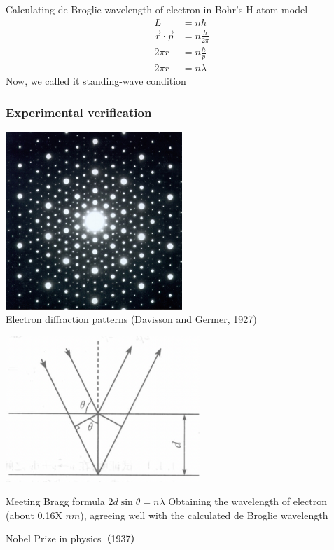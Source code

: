 \begin{frame}  
    \frame{}
    Calculating de Broglie wavelength of electron in Bohr's H atom model
    \begin{equation*}
        \begin{split}
            L&=n\hbar \\
            \vec{r} \cdot \vec{p} & =  n\frac{h}{2 \pi} \\
            2\pi r&=  n\frac{h}{p}\\
            2\pi r&=  n\lambda 
        \end{split} 
     \end{equation*}
     Now, we called it standing-wave condition 
\end{frame}


\begin{frame}   
  \frametitle{Experimental verification}
  \begin{center}
    \includegraphics[width=0.5\textwidth]{figs/elediffr.jpeg} \\
    Electron diffraction patterns (Davisson and Germer, 1927)
    \end{center} 
\end{frame}
\begin{frame}   
    \begin{center}
      \includegraphics[width=0.55\textwidth]{figs/scatting.png} \\
    \end{center} 
    \begin{itemize}
        \Item  Meeting Bragg formula $2d\sin \theta=n\lambda $
        \Item  Obtaining the wavelength of electron (about 0.16X $nm$), agreeing well with the 
   calculated de Broglie wavelength 
    \end{itemize}
  {\color{deepred} Nobel Prize in physics（1937）}  
  \end{frame}

